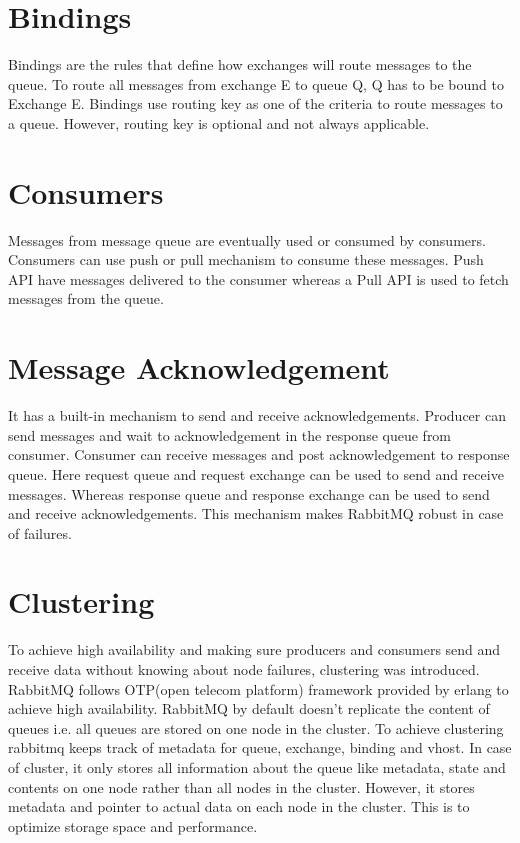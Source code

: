 \documentclass[9pt,twocolumn,twoside]{styles/osajnl}
\begin{document}
\section{Bindings}

Bindings are the rules that define how exchanges will route messages to the queue. To route all messages from exchange E to queue Q, Q has to be bound to Exchange E. Bindings use routing key as one of the criteria to route messages to a queue. However, routing key is optional and not always applicable.

\section{Consumers}

Messages from message queue are eventually used or consumed by consumers. Consumers can use push or pull mechanism to consume these messages. Push API have messages delivered to the consumer whereas a Pull API is used to fetch messages from the queue. 

\section{Message Acknowledgement}

It has a built-in mechanism to send and receive acknowledgements. Producer can send messages and wait to acknowledgement in the response queue from consumer. Consumer can receive messages and post acknowledgement to response queue. Here request queue and request exchange can be used to send and receive messages. Whereas response queue and response exchange can be used to send and receive acknowledgements. This mechanism makes RabbitMQ robust in case of failures.

\section{Clustering}

\cite{videla2012rabbitmq}To achieve high availability and making sure producers and consumers send and receive data without knowing about node failures, clustering was introduced. RabbitMQ follows OTP(open telecom platform) framework provided by erlang to achieve high availability. RabbitMQ by default doesn't replicate the content of queues i.e. all queues are stored on one node in the cluster. To achieve clustering rabbitmq keeps track of metadata for queue, exchange, binding and vhost. In case of cluster, it only stores all information about the queue like metadata, state and contents on one node rather than all nodes in the cluster. However, it stores metadata and pointer to actual data on each node in the cluster. This is to optimize storage space and performance. 
\end{document}
